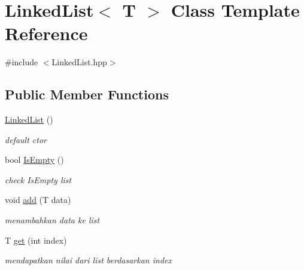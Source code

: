 \hypertarget{classLinkedList}{}\section{Linked\+List$<$ T $>$ Class Template Reference}
\label{classLinkedList}


{\ttfamily \#include $<$Linked\+List.\+hpp$>$}

\subsection*{Public Member Functions}
\begin{DoxyCompactItemize}
\item 
\mbox{\label{classLinkedList_a3c20fcfec867e867f541061a09fc640c}} 
\hyperlink{classLinkedList_a3c20fcfec867e867f541061a09fc640c}{Linked\+List} ()
\begin{DoxyCompactList}\small\item\em default ctor \end{DoxyCompactList}\item 
\mbox{\label{classLinkedList_ac5a0d903d22d1157e98b6d3c182e1c74}} 
bool \hyperlink{classLinkedList_ac5a0d903d22d1157e98b6d3c182e1c74}{Is\+Empty} ()
\begin{DoxyCompactList}\small\item\em check Is\+Empty list \end{DoxyCompactList}\item 
\mbox{\label{classLinkedList_aad1e9d6d7611d4f0bfde0e90da2c108b}} 
void \hyperlink{classLinkedList_aad1e9d6d7611d4f0bfde0e90da2c108b}{add} (T data)
\begin{DoxyCompactList}\small\item\em menambahkan data ke list \end{DoxyCompactList}\item 
\mbox{\label{classLinkedList_a25079ed9b408efad63a1522c818d8705}} 
T \hyperlink{classLinkedList_a25079ed9b408efad63a1522c818d8705}{get} (int index)
\begin{DoxyCompactList}\small\item\em mendapatkan nilai dari list berdasarkan index \end{DoxyCompactList}\item 

\end{DoxyCompactItemize}
